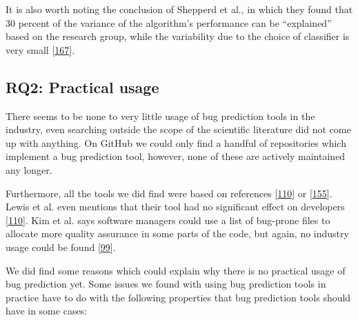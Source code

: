 \documentclass[]{book}
\begin{document}
It is also worth noting the conclusion of Shepperd et al., in which they
found that 30 percent of the variance of the algorithm's performance can
be ``explained'' based on the research group, while the variability due
to the choice of classifier is very small
{[}\protect\hyperlink{ref-Shepperd2014}{167}{]}.

\subsection{RQ2: Practical usage}\label{rq2-practical-usage}

There seems to be none to very little usage of bug prediction tools in
the industry, even searching outside the scope of the scientific
literature did not come up with anything. On GitHub we could only find a
handful of repositories which implement a bug prediction tool, however,
none of these are actively maintained any longer.

Furthermore, all the tools we did find were based on references
{[}\protect\hyperlink{ref-Lewis2013}{110}{]} or
{[}\protect\hyperlink{ref-rahman2011}{155}{]}. Lewis et al. even
mentions that their tool had no significant effect on developers
{[}\protect\hyperlink{ref-Lewis2013}{110}{]}. Kim et al. says software
managers could use a list of bug-prone files to allocate more quality
assurance in some parts of the code, but again, no industry usage could
be found {[}\protect\hyperlink{ref-kim2007}{99}{]}.

We did find some reasons which could explain why there is no practical
usage of bug prediction yet. Some issues we found with using bug
prediction tools in practice have to do with the following properties
that bug prediction tools should have in some cases:
\end{document}
